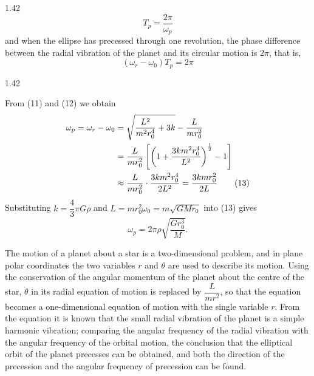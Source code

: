 \begin{solution}{1.42}
\begin{equation}
T_p=\frac{2\pi}{\omega_p} \tag{11}
\end{equation}
and when the ellipse has precessed through one revolution, the phase difference between the radial vibration of the planet and its circular motion is $2\pi$, that is,
\begin{equation}
(\omega_r-\omega_0)T_p=2\pi \tag{12}
\end{equation}

\begin{figbox}{1.42}
\end{figbox}

From (11) and (12) we obtain
\begin{align}
\omega_p=\omega_r-\omega_0&=\sqrt{\frac{L^2}{m^2r_0^4}+3k}-\frac{L}{mr_0^2}\notag\\
&=\frac{L}{mr_0^2}\left[\left(1+\frac{3km^2r_0^4}{L^2}\right)^{\frac{1}{2}}-1\right]\notag\\
&\approx\frac{L}{mr_0^2}\cdot\frac{3km^2r_0^4}{2L^2}=\frac{3kmr_0^2}{2L} \tag{13}
\end{align}
Substituting $k=\dfrac{4}{3}\pi G\rho$ and $L=mr_0^2\omega_0=m\sqrt{GMr_0}$ into (13) gives
\[
\omega_p=2\pi\rho\sqrt{\frac{Gr_0^3}{M}}.
\]

\begin{commentary}
The motion of a planet about a star is a two-dimensional problem, and in plane polar coordinates the two variables $r$ and $\theta$ are used to describe its motion. Using the conservation of the angular momentum of the planet about the centre of the star, $\dot\theta$ in its radial equation of motion is replaced by $\dfrac{L}{mr^2}$, so that the equation becomes a one-dimensional equation of motion with the single variable $r$. From the equation it is known that the small radial vibration of the planet is a simple harmonic vibration; comparing the angular frequency of the radial vibration with the angular frequency of the orbital motion, the conclusion that the elliptical orbit of the planet precesses can be obtained, and both the direction of the precession and the angular frequency of precession can be found.
\end{commentary}
\end{solution}

